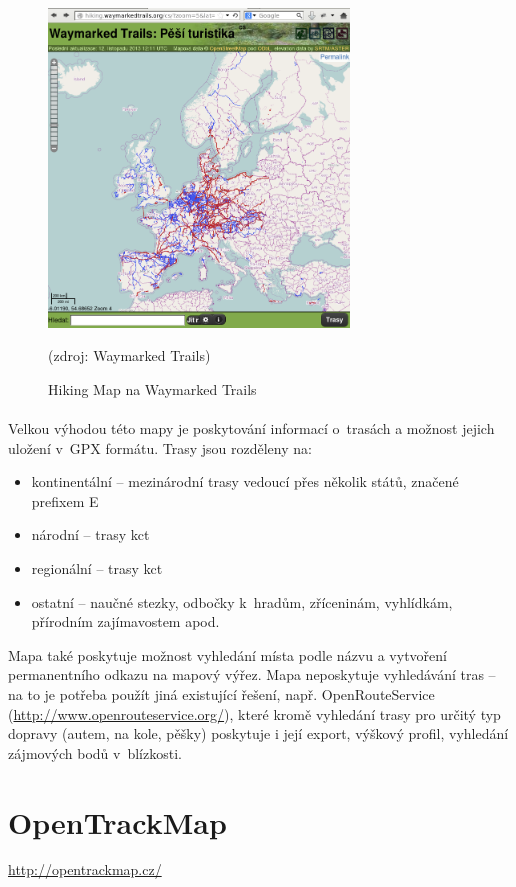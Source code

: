 \documentclass[11pt,a4paper,titlepage,oneside]{book}
\begin{document}
		\begin{figure}[!h]
			\begin{center}
				\includegraphics[width=8cm]{obrazky/waymarkedTrails.png}
				\caption{Hiking Map na Waymarked Trails}
				(zdroj: Waymarked Trails\cite{Waymarked})
			\end{center}
		\end{figure}
	
		\paragraph{} Velkou výhodou této mapy je poskytování informací o~trasách a možnost jejich uložení v~\ac{GPX} formátu. Trasy jsou rozděleny na:
	\begin{itemize}
		 \item kontinentální -- mezinárodní trasy vedoucí přes několik států, značené prefixem E
		 \item národní -- trasy \ac{kct}
		 \item regionální -- trasy \ac{kct}
     		 \item ostatní -- naučné stezky, odbočky k~hradům, zříceninám, vyhlídkám, přírodním zajímavostem apod.
	\end{itemize}
  Mapa také poskytuje možnost vyhledání místa podle názvu a vytvoření permanentního odkazu na mapový výřez. Mapa neposkytuje vyhledávání tras -- na to je potřeba použít jiná existující řešení, např. OpenRouteService (\url{http://www.openrouteservice.org/}), které kromě vyhledání trasy pro určitý typ dopravy (autem, na kole, pěšky) poskytuje i její export, výškový profil, vyhledání zájmových bodů v~blízkosti.

 	\section{OpenTrackMap}
		\url{http://opentrackmap.cz/}
\end{document}
